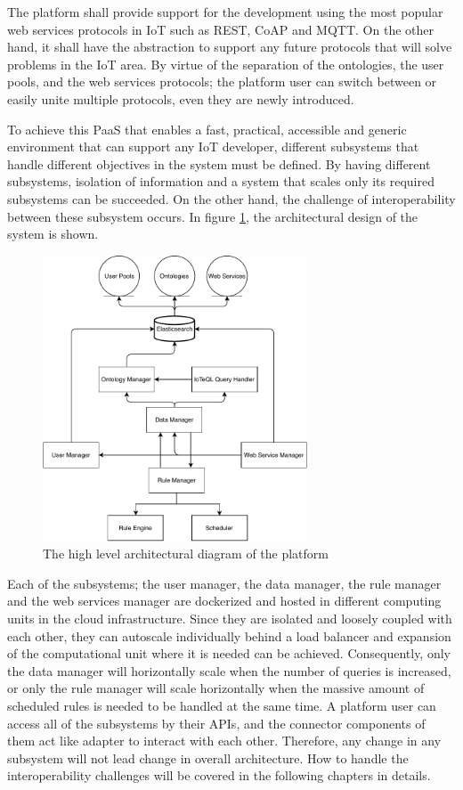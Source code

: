 The platform shall provide support for the development using the most popular web services protocols in IoT such as REST, CoAP and MQTT. On the other hand, it shall have the abstraction to support any future protocols that will solve problems in the IoT area. By virtue of the separation of the ontologies, the user pools, and the web services protocols; the platform user can switch between or easily unite multiple protocols, even they are newly introduced.

To achieve this PaaS that enables a fast, practical, accessible and generic environment that can support any IoT developer, different subsystems that handle different objectives in the system must be defined. By having different subsystems,  isolation of information and a system that scales only its required subsystems can be succeeded. On the other hand, the challenge of interoperability between these subsystem occurs. In figure \ref{fig:architecture}, the architectural design of the system is shown.
\clearpage
\begin{figure}[h]
  \centering
  \includegraphics[width=0.7\textwidth,height=\textheight,keepaspectratio]{figures/high_level_architectural_diagram.pdf}
  \caption[Platform Architecture]{The high level architectural diagram of the platform}\label{fig:architecture}
\end{figure}

Each of the subsystems; the user manager, the data manager, the rule manager and the web services manager are dockerized and hosted in different computing units in the cloud infrastructure. Since they are isolated and loosely coupled with each other, they can autoscale individually behind a load balancer and expansion of the computational unit where it is needed can be achieved. Consequently, only the data manager will horizontally scale when the number of queries is increased, or only the rule manager will scale horizontally when the massive amount of scheduled rules is needed to be handled at the same time. A platform user can access all of the subsystems by their APIs, and the connector components of them act like adapter to interact with each other. Therefore, any change in any subsystem will not lead change in overall architecture. How to handle the interoperability challenges will be covered in the following chapters in details.


